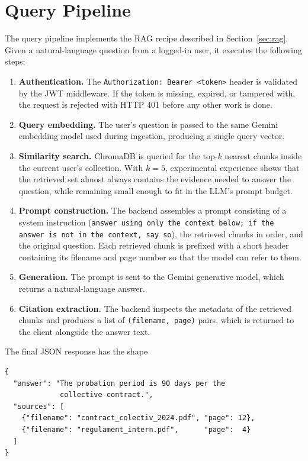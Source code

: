 \section{Query Pipeline}
\label{sec:query-pipeline}

The query pipeline implements the RAG recipe described in
Section~\ref{sec:rag}. Given a natural-language question from a logged-in
user, it executes the following steps:

\begin{enumerate}
  \item \textbf{Authentication.} The \texttt{Authorization: Bearer <token>}
        header is validated by the JWT middleware. If the token is missing,
        expired, or tampered with, the request is rejected with HTTP
        401 before any other work is done.
  \item \textbf{Query embedding.} The user's question is passed to the
        same Gemini embedding model used during ingestion, producing a
        single query vector.
  \item \textbf{Similarity search.} ChromaDB is queried for the top-$k$
        nearest chunks inside the current user's collection. With
        $k=5$, experimental experience shows that the retrieved set almost
        always contains the evidence needed to answer the question, while
        remaining small enough to fit in the LLM's prompt budget.
  \item \textbf{Prompt construction.} The backend assembles a prompt
        consisting of a system instruction (\texttt{answer using only the
        context below; if the answer is not in the context, say so}),
        the retrieved chunks in order, and the original question. Each
        retrieved chunk is prefixed with a short header containing its
        filename and page number so that the model can refer to them.
  \item \textbf{Generation.} The prompt is sent to the Gemini generative
        model, which returns a natural-language answer.
  \item \textbf{Citation extraction.} The backend inspects the metadata of
        the retrieved chunks and produces a list of
        \texttt{(filename, page)} pairs, which is returned to the client
        alongside the answer text.
\end{enumerate}

The final JSON response has the shape

\begin{verbatim}
{
  "answer": "The probation period is 90 days per the
             collective contract.",
  "sources": [
    {"filename": "contract_colectiv_2024.pdf", "page": 12},
    {"filename": "regulament_intern.pdf",      "page":  4}
  ]
}
\end{verbatim}

